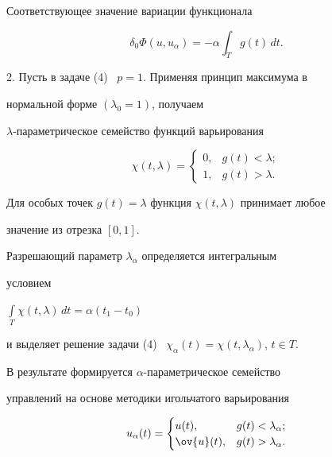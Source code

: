Соответствующее значение вариации функционала


\begin{equation}


\delta_{0} \Phi(u, u_{\alpha}) = - \alpha \int_{T} g(t)\,dt.


\end{equation}





2. Пусть в задаче (4) \ $p = 1$. Применяя принцип максимума в


нормальной форме $(\lambda_{0} = 1)$, получаем


$\lambda$-параметрическое семейство функций варьирования


$$


\chi(t, \lambda) =


\begin{cases}


0, & g(t) < \lambda; \\


1, & g(t) > \lambda.


\end{cases}


$$


Для особых точек $g(t)=\lambda$ функция $ \chi(t, \lambda)$ принимает любое 


значение из отрезка $[0, 1].$





Разрешающий параметр $\lambda_{\alpha}$ определяется интегральным


условием


$\int\limits_{T} \chi(t, \lambda)\,dt = \alpha (t_{1} - t_{0})$


и выделяет решение задачи (4) \ $\chi_{\alpha}(t) = \chi(t,


\lambda_{\alpha})$, $t \in T$.





В результате формируется $\alpha$-параметрическое семейство


управлений на основе методики игольчатого варьирования


\begin{equation}


u_{\alpha}(t) =


\begin{cases}


u(t), & g(t) < \lambda_{\alpha}; \\


\ov{u}(t), & g(t) > \lambda_{\alpha}.


\end{cases}


\end{equation}


